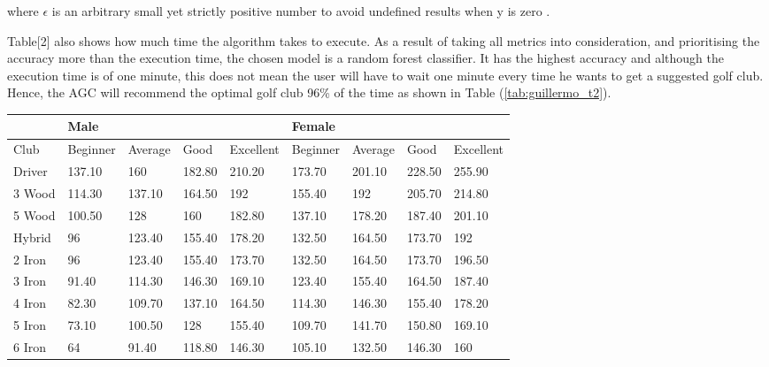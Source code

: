 \documentclass[11pt,landscape]{article}
\begin{document}
\begin{multicols}{3}
where $\epsilon$ is an arbitrary small yet strictly positive number to avoid
undefined results when y is zero
\cite{scikit}.

Table[2] also shows how much time the algorithm takes to execute. As a result of
taking all metrics into consideration, and prioritising the accuracy more than
the execution time, the chosen model is a random forest classifier. It has the
highest accuracy and although the execution time is of one minute, this does not
mean the user will have to wait one minute every time he wants to get a
suggested golf club. Hence, the AGC will recommend the optimal golf club 96\% of
the time as shown in Table (\ref{tab:guillermo_t2}).



\end{multicols}
\newpage
\begin{table}
    \centering
    \begin{tabular}{|l|l|l|l|l|l|l|l|l|}
        \hline
                   & Male     &         &        &           & Female   &         &        &           \\ \hline
    Club           & Beginner & Average & Good   & Excellent & Beginner & Average & Good   & Excellent \\ \hline
    Driver         & 137.10   & 160     & 182.80 & 210.20    & 173.70   & 201.10  & 228.50 & 255.90    \\ \hline
    3 Wood         & 114.30   & 137.10  & 164.50 & 192       & 155.40   & 192     & 205.70 & 214.80    \\ \hline
    5 Wood         & 100.50   & 128     & 160    & 182.80    & 137.10   & 178.20  & 187.40 & 201.10    \\ \hline
    Hybrid         & 96       & 123.40  & 155.40 & 178.20    & 132.50   & 164.50  & 173.70 & 192       \\ \hline
    2 Iron         & 96       & 123.40  & 155.40 & 173.70    & 132.50   & 164.50  & 173.70 & 196.50    \\ \hline
    3 Iron         & 91.40    & 114.30  & 146.30 & 169.10    & 123.40   & 155.40  & 164.50 & 187.40    \\ \hline
    4 Iron         & 82.30    & 109.70  & 137.10 & 164.50    & 114.30   & 146.30  & 155.40 & 178.20    \\ \hline
    5 Iron         & 73.10    & 100.50  & 128    & 155.40    & 109.70   & 141.70  & 150.80 & 169.10    \\ \hline
    6 Iron         & 64       & 91.40   & 118.80 & 146.30    & 105.10   & 132.50  & 146.30 & 160       \\ \hline

\end{tabular}
\end{table}
\end{document}
